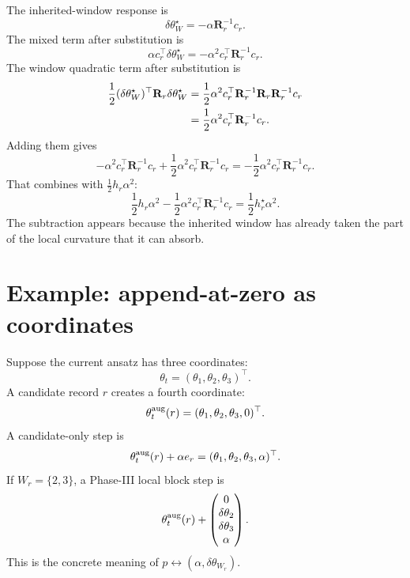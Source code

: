 \documentclass[10pt,twocolumn]{article}
\begin{document}
The inherited-window response is
\begin{equation}
\delta\theta_W^\star=-\alpha\mathbf R_r^{-1}c_r.
\label{eq:subtract_response_repeat}
\end{equation}
The mixed term after substitution is
\begin{equation}
\alpha c_r^\top\delta\theta_W^\star
=-\alpha^2c_r^\top\mathbf R_r^{-1}c_r.
\label{eq:mixed_subtract}
\end{equation}
The window quadratic term after substitution is
\begin{align}
\frac12(\delta\theta_W^\star)^\top\mathbf R_r\delta\theta_W^\star
&=
\frac12\alpha^2
c_r^\top\mathbf R_r^{-1}\mathbf R_r\mathbf R_r^{-1}c_r
\notag\\
&=
\frac12\alpha^2c_r^\top\mathbf R_r^{-1}c_r.
\label{eq:window_add_half}
\end{align}
Adding them gives
\begin{equation}
-\alpha^2c_r^\top\mathbf R_r^{-1}c_r
+\frac12\alpha^2c_r^\top\mathbf R_r^{-1}c_r
=-\frac12\alpha^2c_r^\top\mathbf R_r^{-1}c_r.
\label{eq:subtract_total}
\end{equation}
That combines with \(\frac12h_r\alpha^2\):
\begin{equation}
\frac12h_r\alpha^2
-\frac12\alpha^2c_r^\top\mathbf R_r^{-1}c_r
=
\frac12h_r^\star\alpha^2.
\label{eq:subtract_curvature}
\end{equation}
The subtraction appears because the inherited window has already taken the part of the local curvature that it can absorb.

\section{Example: append-at-zero as coordinates}

Suppose the current ansatz has three coordinates:
\begin{equation}
\theta_t=(\theta_1,\theta_2,\theta_3)^\top.
\label{eq:app_zero_theta}
\end{equation}
A candidate record \(r\) creates a fourth coordinate:
\begin{equation}
\theta_t^{\rm aug}(r)
=
(\theta_1,\theta_2,\theta_3,0)^\top.
\label{eq:app_zero_aug}
\end{equation}
A candidate-only step is
\begin{equation}
\theta_t^{\rm aug}(r)+\alpha e_r
=
(\theta_1,\theta_2,\theta_3,\alpha)^\top.
\label{eq:app_zero_scalar}
\end{equation}
If \(W_r=\{2,3\}\), a Phase-III local block step is
\begin{equation}
\theta_t^{\rm aug}(r)+
\begin{pmatrix}
0\\
\delta\theta_2\\
\delta\theta_3\\
\alpha
\end{pmatrix}.
\label{eq:app_zero_block}
\end{equation}
This is the concrete meaning of \(p\leftrightarrow(\alpha,\delta\theta_{W_r})\).
\end{document}
